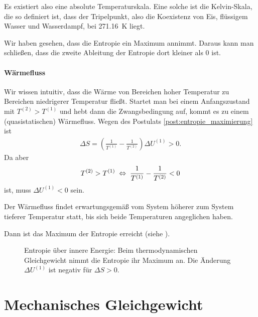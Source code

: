 \begin{formal}
    Es existiert also eine absolute Temperaturskala. Eine solche ist die Kelvin-Skala, die so definiert ist, dass der Tripelpunkt, also die Koexistenz von Eis, flüssigem Wasser und Wasserdampf, bei \qty{271,16}{\kelvin} liegt.
\end{formal}

Wir haben gesehen, dass die Entropie ein Maximum annimmt. Daraus kann man schließen, dass die zweite Ableitung der Entropie dort kleiner als $0$ ist.

\paragraph*{Wärmefluss}

Wir wissen intuitiv, dass die Wärme von Bereichen hoher Temperatur zu Bereichen niedrigerer Temperatur fließt. Startet man bei einem Anfangszustand mit $T^{(2)}> T^{(1)}$ und hebt dann die Zwangsbedingung auf, kommt es zu einem (quasistatischen) Wärmefluss.
Wegen des Postulats \ref{post:entropie_maximierung} ist
\begin{align*}
    \Delta S= \left(\frac{1}{T^{(1)}}-\frac{1}{T^{(2)}}\right)\Delta U^{(1)} > 0.
\end{align*}
Da aber
\begin{align*}
    T^{(2)}> T^{(1)} \;\Leftrightarrow\; \frac{1}{T^{(1)}}-\frac{1}{T^{(2)}} < 0
\end{align*}
ist, muss $\Delta U^{(1)} <0$ sein.
\begin{formal}
    Der Wärmefluss findet erwartungsgemäß vom System höherer zum System tieferer Temperatur statt, bis sich beide Temperaturen angeglichen haben.
\end{formal}
Dann ist das Maximum der Entropie erreicht (siehe ).

\begin{figure}[htbp]
    \centering
    \tfigFunktionEntropieMaximum
    \caption{Entropie über innere Energie: Beim thermodynamischen Gleichgewicht nimmt die Entropie ihr Maximum an. Die Änderung $\Delta U^{(1)}$ ist negativ für $\Delta S>0$. }
    \label{fig:FunktionEntropieMaximum}
\end{figure}




\section{Mechanisches Gleichgewicht}


